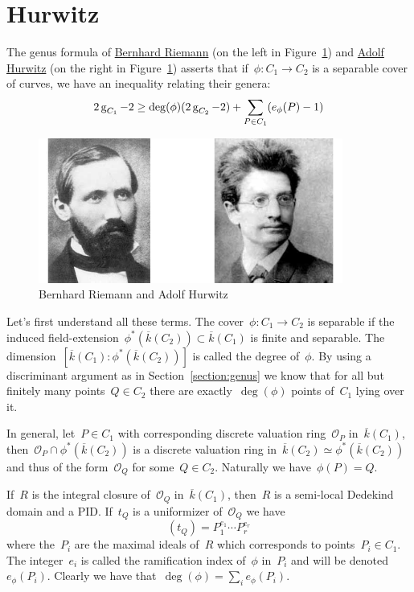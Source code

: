 \section{Hurwitz}
The genus formula of \href{http://en.wikipedia.org/wiki/Bernhard_Riemann}{Bernhard Riemann} (on the left in Figure~\ref{figure:riemann-hurwitz}) and \href{http://en.wikipedia.org/wiki/Adolf_Hurwitz}{Adolf Hurwitz} (on the right in Figure~\ref{figure:riemann-hurwitz}) asserts that if~$\phi\colon C_1 \rightarrow C_2$ is a separable cover of curves, we have an inequality relating their genera:
\begin{equation}
  \label{equation:riemann-hurwitz}
  2 \operatorname{g}_{C_1} - 2 \geq \deg(\phi)(2 \operatorname{g}_{C_2} -2) + \sum_{P \in C_1} (e_{\phi}(P)-1)
\end{equation}

\begin{figure}[hb]
  \centering
  \includegraphics[width=10cm]{0-geometry/riemannhurwitz}
  \caption{Bernhard Riemann and Adolf Hurwitz}
  \label{figure:riemann-hurwitz}
\end{figure}

Let's first understand all these terms. The cover~$\phi\colon C_1 \rightarrow C_2$ is separable if the induced field-extension~$\phi^{\ast}(\overline{k}(C_2)) \subset \overline{k}(C_1)$ is finite and separable. The dimension~$[\overline{k}(C_1) : \phi^{\ast}(\overline{k}(C_2))]$ is called the degree of~$\phi$. By using a discriminant argument as in Section~\ref{section:genus} we know that for all but finitely many points~$Q \in C_2$ there are exactly~$\deg(\phi)$ points of~$C_1$ lying over it.

In general, let~$P \in C_1$ with corresponding discrete valuation ring~$\mathcal{O}_P$ in~$\overline{k}(C_1)$, then~$\mathcal{O}_P \cap \phi^*(\overline{k}(C_2))$ is a discrete valuation ring in~$\overline{k}(C_2) \simeq \phi^*(\overline{k}(C_2))$ and thus of the form~$\mathcal{O}_Q$ for some~$Q \in C_2$. Naturally we have~$\phi(P)=Q$.

If~$R$ is the integral closure of~$\mathcal{O}_Q$ in~$\overline{k}(C_1)$, then~$R$ is a semi-local Dedekind domain and a PID. If~$t_Q$ is a uniformizer of~$\mathcal{O}_Q$ we have
\begin{equation}
  (t_Q) = P_1^{e_1} \cdots P_r^{e_r}
\end{equation}
where the~$P_i$ are the maximal ideals of~$R$ which corresponds to points~$P_i \in C_1$. The integer~$e_i$ is called the ramification index of~$\phi$ in~$P_i$ and will be denoted~$e_{\phi}(P_i)$. Clearly we have that~$\deg(\phi) = \sum_i e_{\phi}(P_i)$. 

